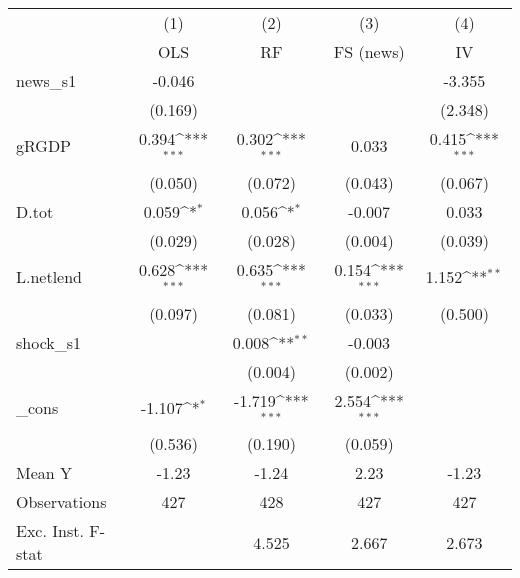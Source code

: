 {
\def\sym#1{\ifmmode^{#1}\else\(^{#1}\)\fi}
\begin{tabular}{l*{4}{c}}
\toprule
            &\multicolumn{1}{c}{(1)}&\multicolumn{1}{c}{(2)}&\multicolumn{1}{c}{(3)}&\multicolumn{1}{c}{(4)}\\
            &\multicolumn{1}{c}{OLS}&\multicolumn{1}{c}{RF}&\multicolumn{1}{c}{FS (news)}&\multicolumn{1}{c}{IV}\\
\midrule
news\_s1     &      -0.046         &                     &                     &      -3.355         \\
            &     (0.169)         &                     &                     &     (2.348)         \\
\addlinespace
gRGDP       &       0.394\sym{***}&       0.302\sym{***}&       0.033         &       0.415\sym{***}\\
            &     (0.050)         &     (0.072)         &     (0.043)         &     (0.067)         \\
\addlinespace
D.tot       &       0.059\sym{*}  &       0.056\sym{*}  &      -0.007         &       0.033         \\
            &     (0.029)         &     (0.028)         &     (0.004)         &     (0.039)         \\
\addlinespace
L.netlend   &       0.628\sym{***}&       0.635\sym{***}&       0.154\sym{***}&       1.152\sym{**} \\
            &     (0.097)         &     (0.081)         &     (0.033)         &     (0.500)         \\
\addlinespace
shock\_s1    &                     &       0.008\sym{**} &      -0.003         &                     \\
            &                     &     (0.004)         &     (0.002)         &                     \\
\addlinespace
\_cons      &      -1.107\sym{*}  &      -1.719\sym{***}&       2.554\sym{***}&                     \\
            &     (0.536)         &     (0.190)         &     (0.059)         &                     \\
\midrule
Mean Y      &       -1.23         &       -1.24         &        2.23         &       -1.23         \\
Observations&         427         &         428         &         427         &         427         \\
Exc. Inst. F-stat&                     &       4.525         &       2.667         &       2.673         \\
\bottomrule
\end{tabular}
}
